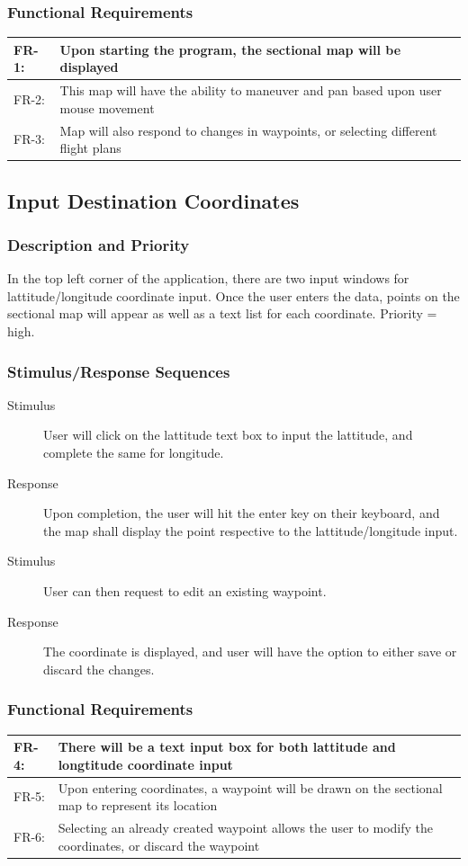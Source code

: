 \documentclass[12pt, letterpaper]{article}
\begin{document}
    \subsubsection{Functional Requirements}
    \begin{tabularx}{\textwidth}{|l|X|} \hline
      FR-1: & Upon starting the program, the sectional map will be displayed\\ \hline
      FR-2: & This map will have the ability to maneuver and pan based upon user mouse movement\\ \hline
      FR-3: & Map will also respond to changes in waypoints, or selecting different flight plans\\ \hline
      \end{tabularx}

  \subsection{Input Destination Coordinates}

    \subsubsection{Description and Priority}
		In the top left corner of the application, there are two input windows for
		lattitude/longitude coordinate input. Once the user enters the data,
		points on the sectional map will appear as well as a text list for each
		coordinate. Priority = high.
    \subsubsection{Stimulus/Response Sequences}
      \begin{description}
        \item[Stimulus] User will click on the lattitude text box to input the
			lattitude, and complete the same for longitude.
		\item[Response] Upon completion, the user will hit the enter key on their
			keyboard, and the map shall display the point respective
			to the lattitude/longitude input.
		\item[Stimulus] User can then request to edit an existing waypoint.
		\item[Response] The coordinate is displayed, and user will have the option to
			either save or discard the changes.
      \end{description}
    \subsubsection{Functional Requirements}
    \begin{tabularx}{\textwidth}{|l|X|} \hline
      FR-4: & There will be a text input box for both lattitude and longtitude coordinate input\\ \hline
      FR-5: & Upon entering coordinates, a waypoint will be drawn on the sectional map to represent its location\\ \hline
      FR-6: & Selecting an already created waypoint allows the user to modify the coordinates, or discard the waypoint\\ \hline
      \end{tabularx}
\end{document}
